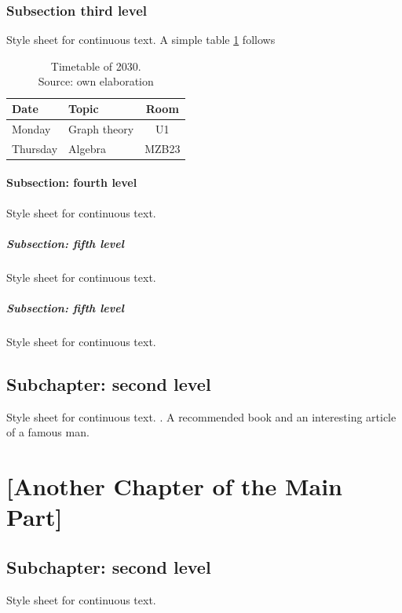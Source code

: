 \subsection{Subsection third level}
Style sheet for continuous text. A simple table \ref{tab:sp} follows

\begin{table}[htb]
  \centering
  \begin{tabular}{ | l | l |c|}
    \hline
    Date      & Topic           & Room \\
    \hline\hline
    Monday     & Graph theory  & U1   \\
    \hline
    Thursday & Algebra         & MZB23\\
    \hline
  \end{tabular}
  \caption[Timetable]{Timetable of 2030.\\ Source: own elaboration}
  \label{tab:sp}
\end{table}

\subsubsection{Subsection: fourth level}
Style sheet for continuous text.

\paragraph{Subsection: fifth level}\mbox{}\newline
Style sheet for continuous text.

\paragraph{Subsection: fifth level}\mbox{}\newline
Style sheet for continuous text.


\section{Subchapter: second level}
Style sheet for continuous text. .
A recommended book \citep[vgl.][Chapter 2]{Chvatal1983} and an interesting article \citep{Einstein1905} of a famous man.


\chapter{[Another Chapter of the Main Part]}

\section{Subchapter: second level}
Style sheet for continuous text.

